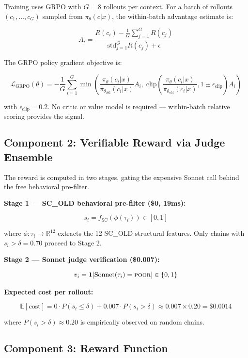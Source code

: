 \documentclass[11pt,a4paper]{article}
\begin{document}
Training uses GRPO \cite{shao2024deepseekmath} with $G = 8$ rollouts per
context. For a batch of rollouts $(c_1, \ldots, c_G)$ sampled from
$\pi_\theta(c|x)$, the within-batch advantage estimate is:

\begin{equation}
A_i = \frac{R(c_i) - \frac{1}{G}\sum_{j=1}^G R(c_j)}
{\text{std}_{j=1}^G R(c_j) + \epsilon}
\label{eq:advantage}
\end{equation}

The GRPO policy gradient objective is:

\begin{equation}
\mathcal{L}_\text{GRPO}(\theta) = -\frac{1}{G} \sum_{i=1}^G
\min\!\left(
  \frac{\pi_\theta(c_i|x)}{\pi_{\theta_\text{old}}(c_i|x)} A_i,\;
  \text{clip}\!\left(\frac{\pi_\theta(c_i|x)}{\pi_{\theta_\text{old}}(c_i|x)},
  1 \pm \epsilon_\text{clip}\right) A_i
\right)
\label{eq:grpo}
\end{equation}

with $\epsilon_\text{clip} = 0.2$. No critic or value model is required ---
within-batch relative scoring provides the signal.

\subsection{Component 2: Verifiable Reward via Judge Ensemble}

The reward is computed in two stages, gating the expensive Sonnet call behind
the free behavioral pre-filter.

\textbf{Stage 1 --- SC\_OLD behavioral pre-filter (\$0, 19ms):}

$$s_i = f_\text{SC}(\phi(\tau_i)) \in [0,1]$$

where $\phi: \tau_i \to \mathbb{R}^{12}$ extracts the 12 SC\_OLD structural
features. Only chains with $s_i > \delta = 0.70$ proceed to Stage 2.

\textbf{Stage 2 --- Sonnet judge verification (\$0.007):}

$$v_i = \mathbf{1}[\text{Sonnet}(\tau_i) = \textsc{poor}] \in \{0, 1\}$$

\textbf{Expected cost per rollout:}

$$\mathbb{E}[\text{cost}] = 0 \cdot P(s_i \leq \delta) +
0.007 \cdot P(s_i > \delta) \approx 0.007 \times 0.20 = \$0.0014$$

where $P(s_i > \delta) \approx 0.20$ is empirically observed on random chains.

\subsection{Component 3: Reward Function}
\end{document}
